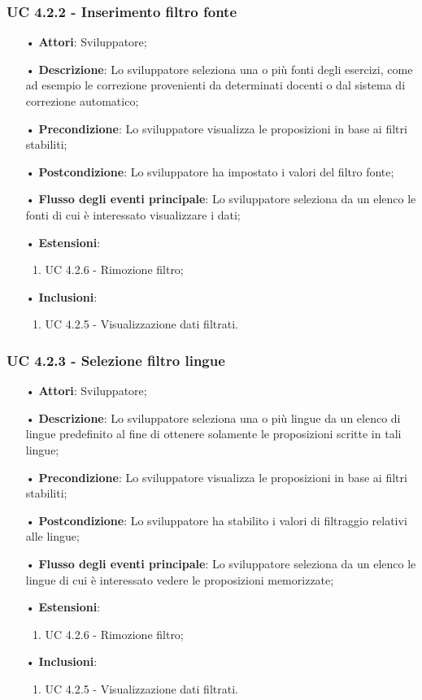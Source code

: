 \subsubsection{UC 4.2.2 - Inserimento filtro fonte}
\begin{itemize}
\item[•]\textbf{Attori}: Sviluppatore;
\item[•]\textbf{Descrizione}: Lo sviluppatore seleziona una o più fonti degli esercizi, come ad esempio le correzione provenienti da determinati docenti o dal sistema di correzione automatico;
\item[•]\textbf{Precondizione}: Lo sviluppatore visualizza le proposizioni in base ai filtri stabiliti;
\item[•]\textbf{Postcondizione}: Lo sviluppatore ha impostato i valori del filtro fonte;
\item[•]\textbf{Flusso degli eventi principale}: Lo sviluppatore seleziona da un elenco le fonti di cui è interessato visualizzare i dati;
\item[•]\textbf{Estensioni}: 
\begin{enumerate}
	\item UC 4.2.6 - Rimozione filtro;
\end{enumerate}
\item[•]\textbf{Inclusioni}:
\begin{enumerate}
\item UC 4.2.5 - Visualizzazione dati filtrati.
\end{enumerate}
\end{itemize}

\subsubsection{UC 4.2.3 -  Selezione filtro lingue}
\begin{itemize}
\item[•]\textbf{Attori}: Sviluppatore;
\item[•]\textbf{Descrizione}: Lo sviluppatore seleziona una o più lingue da un elenco di lingue predefinito al fine di ottenere solamente le proposizioni scritte in tali lingue;
\item[•]\textbf{Precondizione}: Lo sviluppatore visualizza le proposizioni in base ai filtri stabiliti;
\item[•]\textbf{Postcondizione}: Lo sviluppatore ha stabilito i valori di filtraggio relativi alle lingue;
\item[•]\textbf{Flusso degli eventi principale}: Lo sviluppatore seleziona da un elenco le lingue di cui è interessato vedere le proposizioni memorizzate;
\item[•]\textbf{Estensioni}: 
\begin{enumerate}
	\item UC 4.2.6 - Rimozione filtro;
\end{enumerate}
\item[•]\textbf{Inclusioni}:
\begin{enumerate}
\item UC 4.2.5 - Visualizzazione dati filtrati.
\end{enumerate}
\end{itemize}

